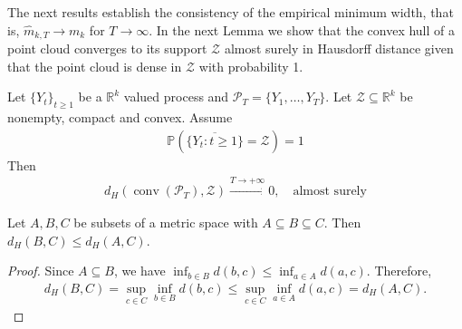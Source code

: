 The next results establish the consistency of the empirical minimum width, that is, $\hat{m}_{k,T}\to m_k$ for $T\to\infty$. In the next Lemma we show that the convex hull of a point cloud converges to its support $\mathcal{Z}$ almost surely in Hausdorff distance given that the point cloud is dense in $\mathcal{Z}$ with probability 1.

\begin{Lem}\label{lem:hausdorff_convergence}
    Let $\{Y_t\}_{t\ge1}$ be a $\mathbb{R}^{k}$ valued process and $\mathcal{P}_T=\{Y_1,\dots,Y_T\}$. Let $\mathcal{Z}\subseteq\mathbb{R}^{k}$ be nonempty, compact and convex. Assume
    \begin{align*}
        \mathbb{P}\left(\overline{\{Y_t:t\ge1\}}=\mathcal{Z}\right)=1
    \end{align*}
    Then
    \begin{align*}
        d_H(\operatorname{conv}(\mathcal{P}_T),\mathcal{Z})\stackrel{T\to+\infty}{\to}0,\quad\text{almost surely}
    \end{align*}
\end{Lem}

\begin{Lem}\label{lem:property_hausdorff_distance}
    Let $A,B,C$ be subsets of a metric space with $A\subseteq B\subseteq C$. Then $d_H(B,C)\le d_H(A,C)$.
\end{Lem}

\begin{proof}
    Since $A\subseteq B$, we have $\inf_{b\in B}d(b,c)\le\inf_{a\in A}d(a,c)$. Therefore,
    \begin{align*}
        d_H(B,C)=\sup_{c\in C}\inf_{b\in B}d(b,c)\le\sup_{c\in C}\inf_{a\in A}d(a,c)=d_H(A,C).
    \end{align*}
\end{proof}

